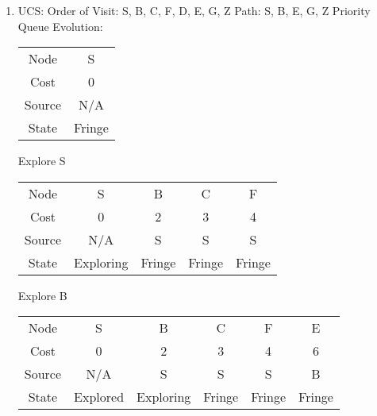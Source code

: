 \documentclass{article}
\begin{document}
    \begin{enumerate}
        \item UCS: 
        \newline
        Order of Visit: S, B, C, F, D, E, G, Z
        \newline
        Path: S, B, E, G, Z
        \newline
        \newline
        Priority Queue Evolution:
        \newline
        \newline
        \begin{left}
            \begin{tabular}{c|c}
            \hline
                Node & S \\
                Cost & 0 \\
                Source & N/A \\
                State & Fringe \\
            \hline
            \end{tabular}
        \end{left}
        \newline
        \newline
        
        
        Explore S
        \newline
        \begin{left}
            \begin{tabular}{c|c|c|c|c}
            \hline
                Node & S & B & C & F \\
                Cost & 0 & 2 & 3 & 4 \\
                Source & N/A & S & S & S \\
                State & Exploring & Fringe & Fringe & Fringe\\
            \hline
            \end{tabular}
        \end{left}
        \newline
        \newline
        
        
        Explore B
        \newline
        \begin{left}
            \begin{tabular}{c|c|c|c|c|c}
            \hline
                Node & S & B & C & F & E\\
                Cost & 0 & 2 & 3 & 4 & 6\\
                Source & N/A & S & S & S & B \\
                State & Explored & Exploring & Fringe & Fringe & Fringe\\
            \hline
            \end{tabular}
        \end{left}
        \newline
        \newline
        

\end{enumerate}
\end{document}
